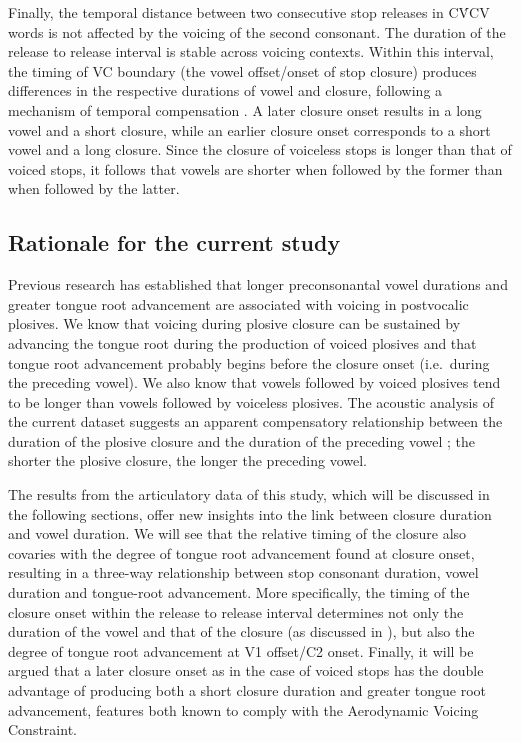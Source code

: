 \documentclass[preprint]{JASAnew}
\begin{document}
Finally, the temporal distance between two consecutive stop releases in
CV́CV words is not affected by the voicing of the second consonant. The
duration of the release to release interval is stable across voicing
contexts. Within this interval, the timing of VC boundary (the vowel
offset/onset of stop closure) produces differences in the respective
durations of vowel and closure, following a mechanism of temporal
compensation
\citep{lindblom1967, slis1969a, slis1969b, lehiste1970a, lehiste1970b}.
A later closure onset results in a long vowel and a short closure, while
an earlier closure onset corresponds to a short vowel and a long
closure. Since the closure of voiceless stops is longer than that of
voiced stops, it follows that vowels are shorter when followed by the
former than when followed by the latter.

\hypertarget{rationale-for-the-current-study}{%
\subsection{Rationale for the current
study}\label{rationale-for-the-current-study}}

Previous research has established that longer preconsonantal vowel
durations \citep{house1953, peterson1960, chen1970} and greater tongue
root advancement \citep{kent1969, perkell1969, westbury1983} are
associated with voicing in postvocalic plosives. We know that voicing
during plosive closure can be sustained by advancing the tongue root
during the production of voiced plosives and that tongue root
advancement probably begins before the closure onset (i.e.~during the
preceding vowel). We also know that vowels followed by voiced plosives
tend to be longer than vowels followed by voiceless plosives. The
acoustic analysis of the current dataset suggests an apparent
compensatory relationship between the duration of the plosive closure
and the duration of the preceding vowel \citep{coretta2019k}; the
shorter the plosive closure, the longer the preceding vowel.

The results from the articulatory data of this study, which will be
discussed in the following sections, offer new insights into the link
between closure duration and vowel duration. We will see that the
relative timing of the closure also covaries with the degree of tongue
root advancement found at closure onset, resulting in a three-way
relationship between stop consonant duration, vowel duration and
tongue-root advancement. More specifically, the timing of the closure
onset within the release to release interval determines not only the
duration of the vowel and that of the closure (as discussed in
\citealt{coretta2019k}), but also the degree of tongue root advancement
at V1 offset/C2 onset. Finally, it will be argued that a later closure
onset as in the case of voiced stops has the double advantage of
producing both a short closure duration and greater tongue root
advancement, features both known to comply with the Aerodynamic Voicing
Constraint.
\end{document}
